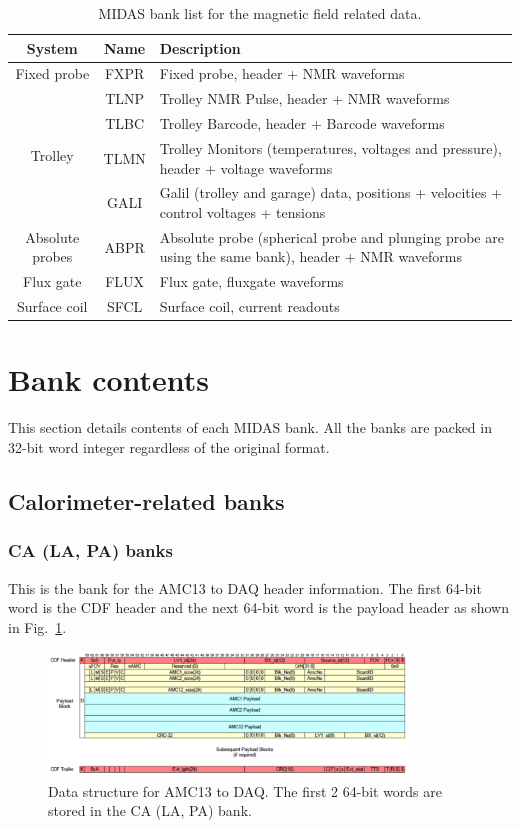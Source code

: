 \begin{table}[htbp]
\centering
\caption{MIDAS bank list for the magnetic field related data.}
\begin{tabular}{|c|c|p{11cm}|}
\hline
System & Name & Description \\
\hline
Fixed probe & FXPR & Fixed probe, header + NMR waveforms \\
\hline
\multirow{4}{*}{Trolley} & TLNP & Trolley NMR Pulse, header + NMR waveforms\\
\cline{2-3}
& TLBC &  Trolley Barcode, header + Barcode waveforms \\
\cline{2-3}
& TLMN & Trolley Monitors (temperatures, voltages and pressure), header + voltage waveforms \\
\cline{2-3}
& GALI &  Galil (trolley and garage) data, positions + velocities + control voltages + tensions\\
\hline
Absolute probes &  ABPR &
Absolute probe (spherical probe and plunging probe are using the same bank), header + NMR waveforms \\ 
\hline
Flux gate & FLUX & Flux gate, fluxgate waveforms \\
\hline
Surface coil & SFCL & Surface coil, current readouts\\
\hline
\end{tabular} 
\label{tab:fieldtable}
\end{table}

\newpage
\section{Bank contents}

This section details contents of each MIDAS bank. All the banks are packed in 32-bit word integer regardless of the original format. 

\subsection{Calorimeter-related banks}

\subsubsection*{CA (LA, PA) banks}

This is the bank for the AMC13 to DAQ header information.
The first 64-bit word is the CDF header and the next 64-bit word is the payload header as shown in Fig.~\ref{fig:AMC13ToDAQ}.

\begin{figure}[htbp]
\centering
\includegraphics[width=0.85\textwidth]{pics/AMC13ToDAQ.pdf} 
\caption{Data structure for AMC13 to DAQ. The first 2 64-bit words are stored in the CA (LA, PA) bank.}\label{fig:AMC13ToDAQ}
\end{figure}

